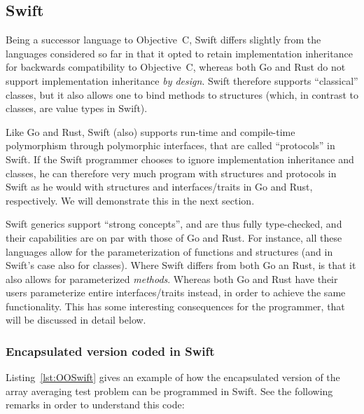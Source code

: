 \documentclass[11pt,oneside]{article}
\begin{document}


\subsection{Swift}

Being a successor language to Objective~C, Swift differs slightly from
the languages considered so far in that it opted to retain
implementation inheritance for backwards compatibility to Objective~C,
whereas both Go and Rust do not support implementation inheritance
\emph{by design}. Swift therefore supports ``classical'' classes, but
it also allows one to bind methods to structures (which, in contrast to
classes, are value types in Swift).

Like Go and Rust, Swift (also) supports run-time and compile-time
polymorphism through polymorphic interfaces, that are called
``protocols'' in Swift. If the Swift programmer chooses to ignore
implementation inheritance and classes, he can therefore very much
program with structures and protocols in Swift as he would with
structures and interfaces/traits in Go and Rust, respectively. We will
demonstrate this in the next section.

Swift generics support ``strong concepts'', and are thus fully
type-checked, and their capabilities are on par with those of Go and
Rust. For instance, all these languages allow for the parameterization
of functions and structures (and in Swift's case also for
classes). Where Swift differs from both Go an Rust, is that it also
allows for parameterized \emph{methods}. Whereas both Go and Rust have
their users parameterize entire interfaces/traits instead, in order to
achieve the same functionality. This has some interesting consequences
for the programmer, that will be discussed in detail below.

\subsubsection{Encapsulated version coded in Swift}

Listing~\ref{lst:OOSwift} gives an example of how the encapsulated
version of the array averaging test problem can be programmed in
Swift. See the following remarks in order to understand this code:
\end{document}
